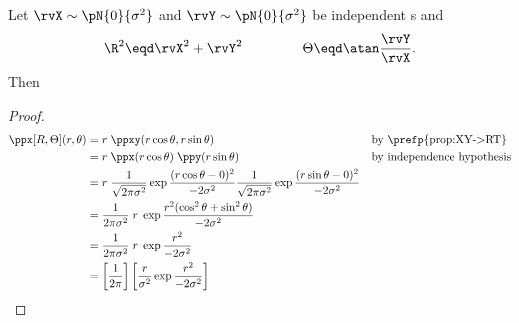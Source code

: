 \begin{proposition}
\label{prop:XY->RT_n}
Let $\rvX\sim\pN{0}{\sigma^2}$ and $\rvY\sim\pN{0}{\sigma^2}$ be
independent s and
\[\R^2 \eqd\rvX^2 +\rvY^2 \hspace{10ex} \Theta \eqd \atan\frac{\rvY}{\rvX}. \]
Then
\end{proposition}
\begin{proof}
\begin{align*}
  \ppx[R,\Theta](r,\theta)
    &= r\;\ppxy(r\cos\theta,r\sin\theta)
    && \text{by \prefp{prop:XY->RT}}
  \\&= r\;\ppx(r\cos\theta) \; \ppy(r\sin\theta)
    && \text{by independence hypothesis}
  \\&= r\;
       \frac{1}{\sqrt{2\pi\sigma^2}}\exp{\frac{(r\cos\theta-0)^2}{-2\sigma^2}}
       \frac{1}{\sqrt{2\pi\sigma^2}}\exp{\frac{(r\sin\theta-0)^2}{-2\sigma^2}}
  \\&= \frac{1}{2\pi\sigma^2}\;r\;
       \exp{\frac{r^2(\cos^2\theta + \sin^2\theta)}{-2\sigma^2}}
  \\&= \frac{1}{2\pi\sigma^2}\;r\;
       \exp{\frac{r^2}{-2\sigma^2}}
  \\&= \left[\frac{1}{2\pi}\right]
       \left[\frac{r}{\sigma^2}\exp{\frac{r^2}{-2\sigma^2}}\right]
\end{align*}
\end{proof}


